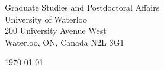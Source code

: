 \begin{minipage}{0.49\textwidth}
\begin{flushleft}
\noindent
Graduate Studies and Postdoctoral Affairs\\
University of Waterloo\\
200 University Avenue West\\
Waterloo, ON, Canada  N2L 3G1
\end{flushleft}
\end{minipage}
\begin{minipage}{0.47\textwidth}
\begin{flushright}
\today
\end{flushright}
\end{minipage} \\

\newcommand{\univ}{University of Waterloo}
\newcommand{\univshort}{Waterloo}
\newcommand{\degree}{M.Sc.}
\newcommand{\dept}{Computer Science}

